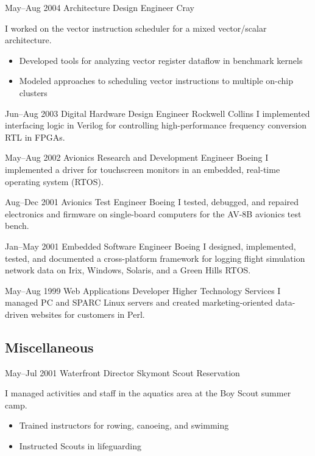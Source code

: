 \documentclass[11pt,a4paper,roman]{moderncv}
\begin{document}
\cventry%
{May--Aug 2004}%
{Architecture Design Engineer}%
{Cray}%
{\chippewafalls}%
{}%
{I worked on the vector instruction scheduler for a mixed vector/scalar architecture.
\begin{itemize}
\item Developed tools for analyzing vector register dataflow in benchmark kernels
\item Modeled approaches to scheduling vector instructions to multiple on-chip clusters
\end{itemize}}

\cventry%
{Jun--Aug 2003}%
{Digital Hardware Design Engineer}%
{Rockwell Collins}%
{\whitemarsh}%
{}%
{I implemented interfacing logic in Verilog for controlling high-performance frequency conversion RTL in FPGAs.}

\cventry%
{May--Aug 2002}%
{Avionics Research and Development Engineer}%
{Boeing}%
{\stlouis}%
{}%
{I implemented a driver for touchscreen monitors in an embedded, real-time operating system (RTOS).}

\cventry%
{Aug--Dec 2001}%
{Avionics Test Engineer}%
{Boeing}%
{\stlouis}%
{}%
{I tested, debugged, and repaired electronics and firmware on single-board computers for the AV-8B avionics test bench.}

\cventry%
{Jan--May 2001}%
{Embedded Software Engineer}%
{Boeing}%
{\stlouis}%
{}%
{I designed, implemented, tested, and documented a cross-platform \Cpp framework for logging flight simulation network data on Irix, Windows, Solaris, and a Green Hills RTOS.}

\cventry%
{May--Aug 1999}%
{Web Applications Developer}%
{Higher Technology Services}%
{\chattanooga}%
{}%
{I managed PC and SPARC Linux servers and created marketing-oriented data-driven websites for customers in Perl.}


\subsection{Miscellaneous}

\cventry%
{May--Jul 2001}%
{Waterfront Director}%
{Skymont Scout Reservation}%
{\altamont}%
{}%
{I managed activities and staff in the aquatics area at the Boy Scout summer camp.
\begin{itemize}
\item Trained instructors for rowing, canoeing, and swimming
\item Instructed Scouts in lifeguarding
\end{itemize}}
\end{document}
